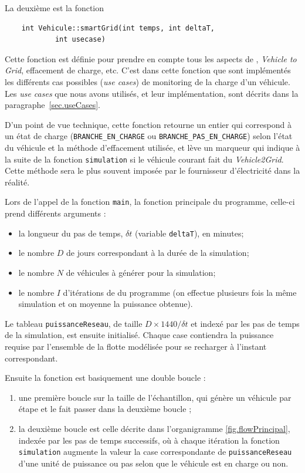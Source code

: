 			La deuxième est la fonction 
			\begin{lstlisting}		
    int Vehicule::smartGrid(int temps, int deltaT, 
            int usecase)		
            \end{lstlisting}		
			Cette fonction est définie pour prendre en compte tous les aspects de \smartgrid{}, \emph{Vehicle to Grid}, effacement de charge, etc. C'est dans cette fonction que sont implémentés les différents cas possibles (\emph{use cases}) de monitoring de la charge d'un véhicule. Les \emph{use cases} que nous avons utilisés, et leur implémentation, sont décrits dans la paragraphe~\vref{sec.useCases}. 
			
			D'un point de vue technique, cette fonction retourne un entier qui correspond à un état de charge (\lstinline{BRANCHE_EN_CHARGE} ou \lstinline{BRANCHE_PAS_EN_CHARGE}) selon l'état du véhicule et la méthode d'effacement utilisée, et lève un marqueur qui indique à la suite de la fonction \lstinline|simulation| si le véhicule courant fait du \emph{Vehicle2Grid}. Cette méthode sera le plus souvent imposée par le fournisseur d’électricité dans la réalité.
			
			\bigskip
			
			Lors de l'appel de la fonction \lstinline{main}, la fonction principale du programme, celle-ci prend différents arguments :
			\begin{itemize}
			\item la longueur du pas de temps, $\delta t$ (variable \lstinline{deltaT}), en minutes;
			\item le nombre $D$ de jours correspondant à la durée de la simulation;
			\item le nombre $N$ de véhicules à générer pour la simulation;
			\item le nombre $I$ d'itérations de du programme (on effectue plusieurs fois la même simulation et on moyenne la puissance obtenue).
			\end{itemize}
			
			Le tableau \lstinline{puissanceReseau}, de taille $D \times 1440 / \delta t$ et indexé par les pas de temps de la simulation, est ensuite initialisé. Chaque case contiendra la puissance requise par l'ensemble de la flotte modélisée pour se recharger à l'instant correspondant.
			
			Ensuite la fonction est basiquement une double boucle :
			\begin{enumerate}
			\item une première boucle sur la taille de l'échantillon, qui génère un véhicule par étape et le fait passer dans la deuxième boucle ;
			\item la deuxième boucle est celle décrite dans l'organigramme \vref{fig.flowPrincipal}, indexée par les pas de temps successifs, où à chaque itération la fonction \lstinline{simulation} augmente la valeur la case correspondante de \lstinline{puissanceReseau} d'une unité de puissance ou pas selon que le véhicule est en charge ou non.
			\end{enumerate}
			

